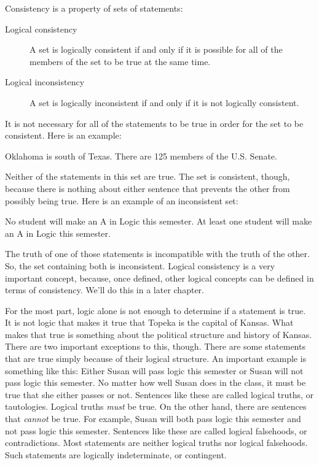 \documentclass[../logic-text.tex]{subfiles}
\begin{document}
Consistency is a property of sets of statements:

\begin{description}
  \item[Logical consistency] A set is logically consistent if and only if it is possible for all of the members of the set to be true at the same time.
  \item[Logical inconsistency] A set is logically inconsistent if and only if it is not logically consistent. 
\end{description}

It is not necessary for all of the statements to be true in order for the set to be consistent. Here is an example:

{Oklahoma is south of Texas. There are 125 members of the U.S. Senate.}

Neither of the statements in this set are true. The set is consistent, though, because there is nothing about either sentence that prevents the other from possibly being true. Here is an example of an inconsistent set:

{No student will make an A in Logic this semester. At least one student will make an A in Logic this semester.}

The truth of one of those statements is incompatible with the truth of the other.
So, the set containing both is inconsistent.
Logical consistency is a very important concept, because, once defined, other logical concepts can be defined in terms of consistency.
We'll do this in a later chapter.

For the most part, logic alone is not enough to determine if a statement is true. It is not logic that makes it true that Topeka is the capital of Kansas. What makes that true is something about the political structure and history of Kansas. There are two important exceptions to this, though. There are some statements that are true simply because of their logical structure. An important example is something like this: Either Susan will pass logic this semester or Susan will not pass logic this semester. No matter how well Susan does in the class, it must be true that she either passes or not. Sentences like these are called logical truths, or tautologies. Logical truths {\em must} be true. On the other hand, there are sentences that {\em cannot} be true. For example, Susan will both pass logic this semester and not pass logic this semester. Sentences like these are called logical falsehoods, or contradictions. Most statements are neither logical truths nor logical falsehoods. Such statements are logically indeterminate, or contingent.
\end{document}
